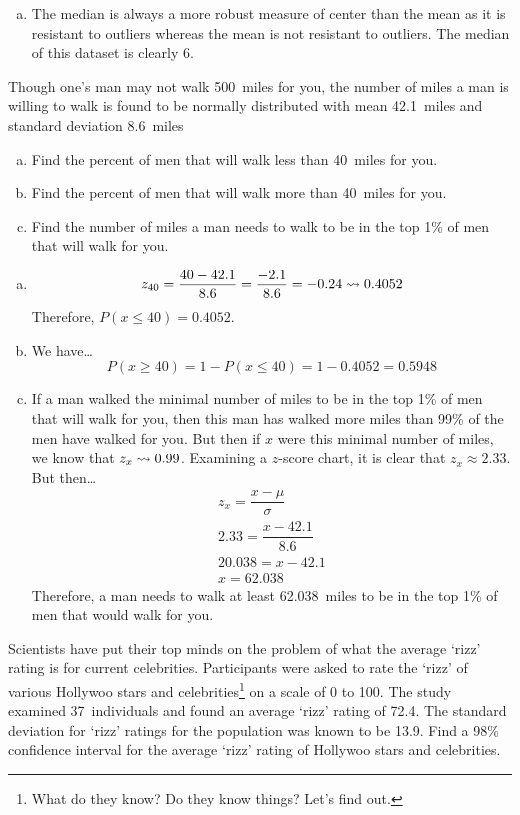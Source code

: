 \documentclass[12pt,letterpaper]{exam}
\begin{document}
\begin{questions}
\begin{enumerate}[(a)]
\item The median is always a more robust measure of center than the mean as it is resistant to outliers whereas the mean is not resistant to outliers. The median of this dataset is clearly 6. 
\end{enumerate}



\newpage
\question[10] Though one's man may not walk 500~miles for you, the number of miles a man is willing to walk is found to be normally distributed with mean 42.1~miles and standard deviation 8.6~miles
	\begin{enumerate}[(a)]
	\item Find the percent of men that will walk less than 40~miles for you.
	\item Find the percent of men that will walk more than 40~miles for you.
	\item Find the number of miles a man needs to walk to be in the top 1\% of men that will walk for you.
	\end{enumerate} \pspace

\sol 
\begin{enumerate}[(a)]
\item 
	\[
	z_{40}= \dfrac{40 - 42.1}{8.6}= \dfrac{-2.1}{8.6}= -0.24 \rightsquigarrow 0.4052
	\]
Therefore, $P(x \leq 40) = 0.4052$. \pspace

\item We have\dots
	\[
	P(x \geq 40) = 1 - P(x \leq 40) = 1 - 0.4052 = 0.5948
	\] \pspace

\item If a man walked the minimal number of miles to be in the top 1\% of men that will walk for you, then this man has walked more miles than 99\% of the men have walked for you. But then if $x$ were this minimal number of miles, we know that $z_x \rightsquigarrow 0.99$. Examining a $z$-score chart, it is clear that $z_x \approx 2.33$. But then\dots
	\[
	\begin{gathered}
	z_x = \dfrac{x - \mu}{\sigma} \\[0.3cm]
	2.33 = \dfrac{x - 42.1}{8.6} \\[0.3cm]
	20.038 = x - 42.1 \\[0.3cm]
	x = 62.038
	\end{gathered}
	\]
Therefore, a man needs to walk at least 62.038~miles to be in the top 1\% of men that would walk for you. 
\end{enumerate}



\newpage
\question[10] Scientists have put their top minds on the problem of what the average `rizz' rating is for current celebrities. Participants were asked to rate the `rizz' of various Hollywoo stars and celebrities\footnote{What do they know? Do they know things? Let's find out.} on a scale of 0 to 100. The study examined 37~individuals and found an average `rizz' rating of 72.4. The standard deviation for `rizz' ratings for the population was known to be 13.9. Find a 98\% confidence interval for the average `rizz' rating of Hollywoo stars and celebrities. \pspace


\end{questions}
\end{document}
